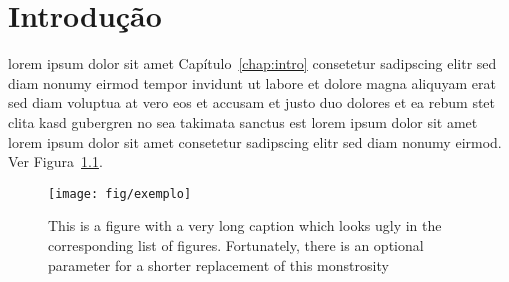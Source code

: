 \chapter{\label{chap:intro}Introdução}
%
%
%
%
%
%
%

lorem ipsum dolor sit amet Capítulo~\ref{chap:intro} consetetur
sadipscing elitr sed diam nonumy eirmod tempor invidunt ut labore
et dolore magna aliquyam erat sed diam voluptua at vero eos et
accusam et justo duo dolores et ea rebum stet clita kasd gubergren
no sea takimata sanctus est lorem ipsum dolor sit amet lorem ipsum
dolor sit amet consetetur sadipscing elitr sed diam nonumy eirmod.
Ver Figura~\ref{fig:fig1}.

\begin{figure}[htb!]
\centering\texttt{[image: fig/exemplo]}
\caption%
        {\label{fig:fig1}This is a figure with a very long
    caption which looks ugly in the corresponding list of figures.
    Fortunately, there is an optional parameter for a shorter
    replacement of this monstrosity}%
\end{figure}

